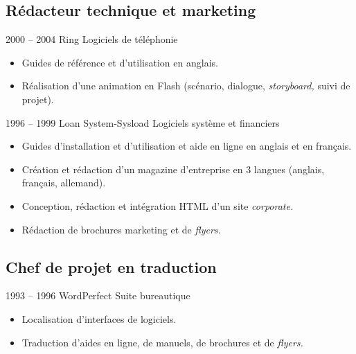 \documentclass[12pt,a4paper,roman]{moderncv}
\begin{document}
\subsection{Rédacteur technique et marketing}

\cventry
    {2000 – 2004}
    {Ring}
    {Logiciels de téléphonie}
    {}
    {}
    {
      \begin{itemize}
      \item Guides de référence et d'utilisation en anglais.
      \item Réalisation d'une animation en Flash (scénario, dialogue,
        \textit{storyboard,} suivi de projet).
    \end{itemize}}


\cventry
    {1996 – 1999}
    {Loan System-Sysload}
    {Logiciels système et financiers}
    {}
    {}
    {
      \begin{itemize}
      \item Guides d'installation et d'utilisation et aide en ligne en anglais
        et en français.
      \item Création et rédaction d'un magazine d'entreprise en 3 langues
        (anglais, français, allemand).
      \item Conception, rédaction et intégration HTML d'un site
        \textit{corporate.}
      \item Rédaction de brochures marketing et de \textit{flyers.}
      \end{itemize}
    }


\subsection{Chef de projet en traduction}

\cventry
    {1993 – 1996}
    {WordPerfect}
    {Suite bureautique}
    {}
    {}
    {
      \begin{itemize}
      \item Localisation d'interfaces de logiciels.
      \item Traduction d'aides en ligne, de manuels, de brochures et de
        \textit{flyers.}
      \end{itemize}
    }

\end{document}
